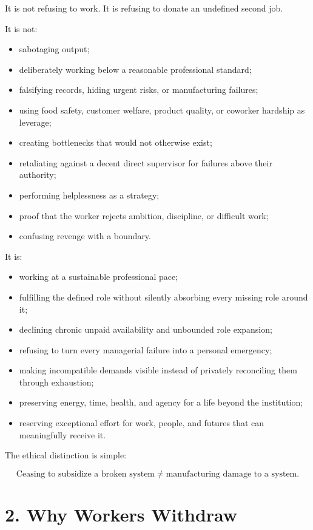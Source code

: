 \documentclass[11pt,oneside]{article}
\providecommand{\tightlist}{%
  \setlength{\itemsep}{0.22em}\setlength{\parskip}{0pt}}
\begin{document}
It is not refusing to work. It is refusing to donate an undefined second
job.

It is not:

\begin{itemize}
\tightlist
\item
  sabotaging output;
\item
  deliberately working below a reasonable professional standard;
\item
  falsifying records, hiding urgent risks, or manufacturing failures;
\item
  using food safety, customer welfare, product quality, or coworker
  hardship as leverage;
\item
  creating bottlenecks that would not otherwise exist;
\item
  retaliating against a decent direct supervisor for failures above
  their authority;
\item
  performing helplessness as a strategy;
\item
  proof that the worker rejects ambition, discipline, or difficult work;
\item
  confusing revenge with a boundary.
\end{itemize}

It is:

\begin{itemize}
\tightlist
\item
  working at a sustainable professional pace;
\item
  fulfilling the defined role without silently absorbing every missing
  role around it;
\item
  declining chronic unpaid availability and unbounded role expansion;
\item
  refusing to turn every managerial failure into a personal emergency;
\item
  making incompatible demands visible instead of privately reconciling
  them through exhaustion;
\item
  preserving energy, time, health, and agency for a life beyond the
  institution;
\item
  reserving exceptional effort for work, people, and futures that can
  meaningfully receive it.
\end{itemize}

The ethical distinction is simple:

\[
\boxed{\text{Ceasing to subsidize a broken system} \neq \text{manufacturing damage to a system}.}
\]

\section{2. Why Workers Withdraw}\label{why-workers-withdraw}
\end{document}
